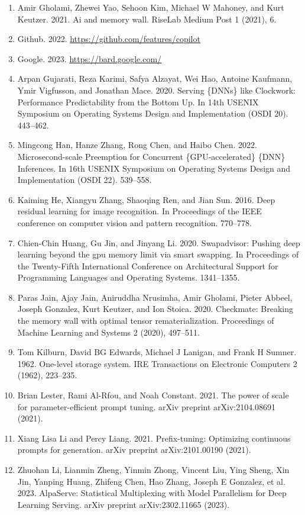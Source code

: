 \documentclass[11pt,UTF8,fontset=fandol]{ctexart}
\begin{document}
\begin{enumerate}[leftmargin=2.2em,labelsep=0.6em,itemsep=0.25em]
\item Amir Gholami, Zhewei Yao, Sehoon Kim, Michael W Mahoney, and Kurt Keutzer. 2021. Ai and memory wall. RiseLab Medium Post 1 (2021), 6.
\item Github. 2022. \url{https://github.com/features/copilot}
\item Google. 2023. \url{https://bard.google.com/}
\item Arpan Gujarati, Reza Karimi, Safya Alzayat, Wei Hao, Antoine Kaufmann, Ymir Vigfusson, and Jonathan Mace. 2020. Serving \{DNNs\} like Clockwork: Performance Predictability from the Bottom Up. In 14th USENIX Symposium on Operating Systems Design and Implementation (OSDI 20). 443--462.
\item Mingcong Han, Hanze Zhang, Rong Chen, and Haibo Chen. 2022. Microsecond-scale Preemption for Concurrent \{GPU-accelerated\} \{DNN\} Inferences. In 16th USENIX Symposium on Operating Systems Design and Implementation (OSDI 22). 539--558.
\item Kaiming He, Xiangyu Zhang, Shaoqing Ren, and Jian Sun. 2016. Deep residual learning for image recognition. In Proceedings of the IEEE conference on computer vision and pattern recognition. 770--778.
\item Chien-Chin Huang, Gu Jin, and Jinyang Li. 2020. Swapadvisor: Pushing deep learning beyond the gpu memory limit via smart swapping. In Proceedings of the Twenty-Fifth International Conference on Architectural Support for Programming Languages and Operating Systems. 1341--1355.
\item Paras Jain, Ajay Jain, Aniruddha Nrusimha, Amir Gholami, Pieter Abbeel, Joseph Gonzalez, Kurt Keutzer, and Ion Stoica. 2020. Checkmate: Breaking the memory wall with optimal tensor rematerialization. Proceedings of Machine Learning and Systems 2 (2020), 497--511.
\item Tom Kilburn, David BG Edwards, Michael J Lanigan, and Frank H Sumner. 1962. One-level storage system. IRE Transactions on Electronic Computers 2 (1962), 223--235.
\item Brian Lester, Rami Al-Rfou, and Noah Constant. 2021. The power of scale for parameter-efficient prompt tuning. arXiv preprint arXiv:2104.08691 (2021).
\item Xiang Lisa Li and Percy Liang. 2021. Prefix-tuning: Optimizing continuous prompts for generation. arXiv preprint arXiv:2101.00190 (2021).
\item Zhuohan Li, Lianmin Zheng, Yinmin Zhong, Vincent Liu, Ying Sheng, Xin Jin, Yanping Huang, Zhifeng Chen, Hao Zhang, Joseph E Gonzalez, et al. 2023. AlpaServe: Statistical Multiplexing with Model Parallelism for Deep Learning Serving. arXiv preprint arXiv:2302.11665 (2023).

\end{enumerate}
\end{document}
